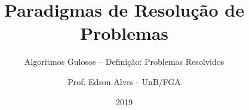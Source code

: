 \title{Paradigmas de Resolução de Problemas}
\subtitle{Algoritmos Gulosos -- Definição: Problemas Resolvidos}
\author{Prof. Edson Alves - UnB/FGA}
\date{2019}
